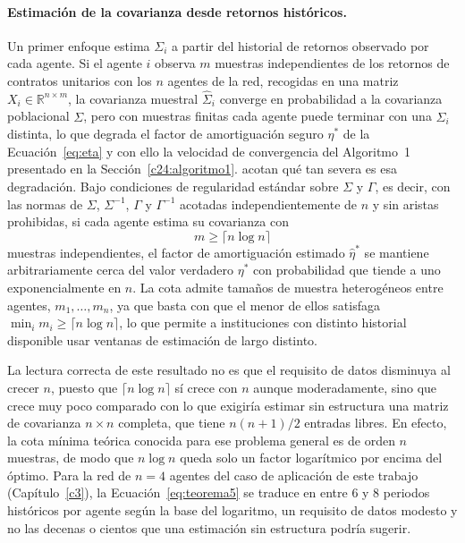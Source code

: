 \paragraph{Estimación de la covarianza desde retornos históricos.}
Un primer enfoque estima $\Sigma_i$ a partir del historial de retornos observado por cada agente. Si el agente $i$ observa $m$ muestras independientes de los retornos de contratos unitarios con los $n$ agentes de la red, recogidas en una matriz $X_i \in \mathbb{R}^{n \times m}$, la covarianza muestral $\hat\Sigma_i$ converge en probabilidad a la covarianza poblacional $\Sigma$, pero con muestras finitas cada agente puede terminar con una $\hat\Sigma_i$ distinta, lo que degrada el factor de amortiguación seguro $\eta^*$ de la Ecuación~\eqref{eq:eta} y con ello la velocidad de convergencia del Algoritmo~1 presentado en la Sección~\ref{c24:algoritmo1}.  acotan qué tan severa es esa degradación. Bajo condiciones de regularidad estándar sobre $\Sigma$ y $\Gamma$, es decir, con las normas de $\Sigma$, $\Sigma^{-1}$, $\Gamma$ y $\Gamma^{-1}$ acotadas independientemente de $n$ y sin aristas prohibidas, si cada agente estima su covarianza con
\begin{equation}
\label{eq:teorema5}
    m \geq \lceil n \log n \rceil
\end{equation}
muestras independientes, el factor de amortiguación estimado $\hat\eta^*$ se mantiene arbitrariamente cerca del valor verdadero $\eta^*$ con probabilidad que tiende a uno exponencialmente en $n$. La cota admite tamaños de muestra heterogéneos entre agentes, $m_1,\dots,m_n$, ya que basta con que el menor de ellos satisfaga $\min_i m_i \geq \lceil n \log n \rceil$, lo que permite a instituciones con distinto historial disponible usar ventanas de estimación de largo distinto.

La lectura correcta de este resultado no es que el requisito de datos disminuya al crecer $n$, puesto que $\lceil n \log n \rceil$ sí crece con $n$ aunque moderadamente, sino que crece muy poco comparado con lo que exigiría estimar sin estructura una matriz de covarianza $n \times n$ completa, que tiene $n(n+1)/2$ entradas libres. En efecto, la cota mínima teórica conocida para ese problema general es de orden $n$ muestras, de modo que $n \log n$ queda solo un factor logarítmico por encima del óptimo. Para la red de $n=4$ agentes del caso de aplicación de este trabajo (Capítulo~\ref{c3}), la Ecuación~\eqref{eq:teorema5} se traduce en entre $6$ y $8$ periodos históricos por agente según la base del logaritmo, un requisito de datos modesto y no las decenas o cientos que una estimación sin estructura podría sugerir.

